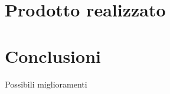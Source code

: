 \documentclass[10pt, xetex]{beamer}
\begin{document}
\section{Prodotto realizzato}
\begin{frame}{}
\end{frame}

\section{Conclusioni}
\begin{frame}{Possibili miglioramenti}
\end{frame}
\end{document}
